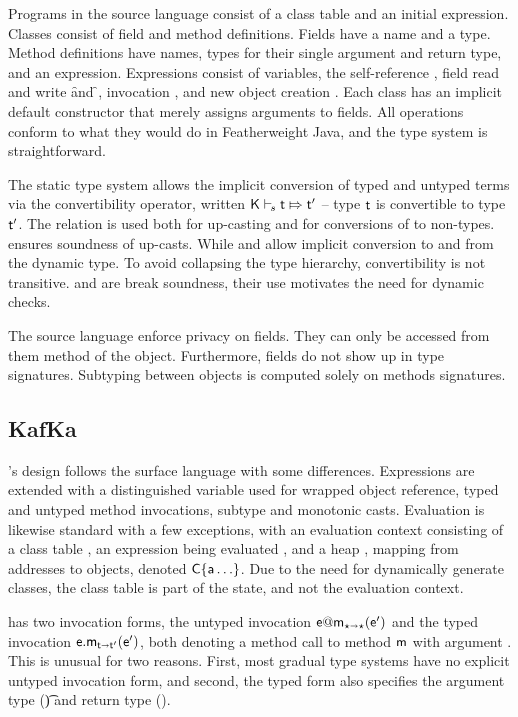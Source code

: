 \documentclass[sigconf]{acmart}
\begin{document}
Programs in the source language consist of a class table and an initial
expression. Classes consist of field and method definitions. Fields have a
name and a type. Method definitions have names, types for their single
argument and return type, and an expression. Expressions consist of
variables, the self-reference \this, field read and write \FRead\f and
\FWrite\f\e, invocation \Call\e\m\e, and new object creation
\New{}. Each class has an implicit default constructor that merely
assigns arguments to fields. All operations conform to what they would do in
Featherweight Java, and the type system is straightforward.

The static type system allows the implicit conversion of typed and untyped
terms via the convertibility operator, written $\ConvertE\K s\t\tp$ -- type
$\t$ is convertible to type $\tp$.  The relation is used both for up-casting
and for conversions of \any to non-\any types.   ensures
soundness of up-casts. While  and  allow implicit
conversion to and from the dynamic type.  To avoid collapsing the type
hierarchy, convertibility is not transitive.  and
 are break soundness, their use motivates the need for dynamic
checks. 

The source language enforce privacy on fields. They can only be accessed
from them method of the object. Furthermore, fields do not show up in type
signatures. Subtyping between objects is computed solely on methods
signatures.


\subsection{KafKa}

\kafka's design follows the surface language with some differences.
Expressions are extended with \that a distinguished variable used for
wrapped object reference, typed and untyped method invocations, subtype and
monotonic casts.  Evaluation is likewise standard with a few exceptions,
with an evaluation context consisting of a class table \K, an expression
being evaluated \e, and a heap \s, mapping from addresses \a to objects,
denoted $\C\{\a\ldots\}$. Due to the need for dynamically generate classes,
the class table \K is part of the state, and not the evaluation context.

\kafka has two invocation forms, the untyped invocation $\DynCall\e\m\ep$
and the typed invocation $\KCall\e\m\ep{\t}{\tp}$, both denoting a method
call to method ${\sf{m}}$ with argument \ep. This is unusual for two
reasons. First, most gradual type systems have no explicit untyped
invocation form, and second, the typed form also specifies the argument type
(\t) and return type (\tp).
\end{document}
